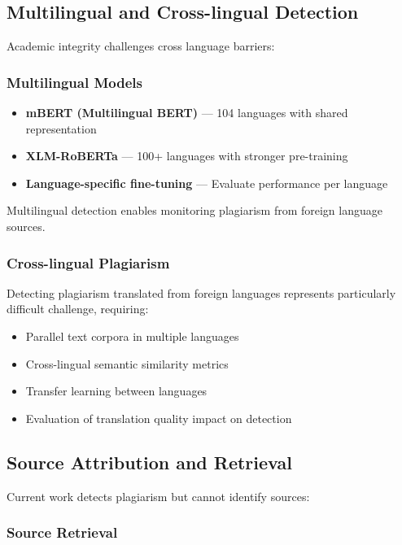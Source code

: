 \subsection{Multilingual and Cross-lingual Detection}

Academic integrity challenges cross language barriers:

\subsubsection{Multilingual Models}

\begin{itemize}
  \item \textbf{mBERT (Multilingual BERT)} --- 104 languages with shared representation
  \item \textbf{XLM-RoBERTa} --- 100+ languages with stronger pre-training
  \item \textbf{Language-specific fine-tuning} --- Evaluate performance per language
\end{itemize}

Multilingual detection enables monitoring plagiarism from foreign language sources.

\subsubsection{Cross-lingual Plagiarism}

Detecting plagiarism translated from foreign languages represents particularly difficult challenge, requiring:

\begin{itemize}
  \item Parallel text corpora in multiple languages
  \item Cross-lingual semantic similarity metrics
  \item Transfer learning between languages
  \item Evaluation of translation quality impact on detection
\end{itemize}

\subsection{Source Attribution and Retrieval}

Current work detects plagiarism but cannot identify sources:

\subsubsection{Source Retrieval}

